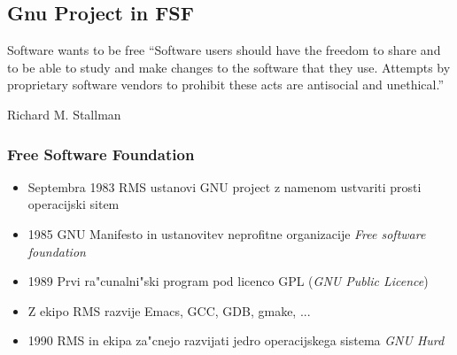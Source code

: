 \documentclass{beamer}
\begin{document}
\subsection{Gnu Project in FSF}
\begin{frame}
\begin{block}{Software wants to be free}
``Software users should have the freedom to share and to be able to study and make changes to the software that they use. Attempts by proprietary software vendors to prohibit these acts are antisocial and unethical.''

\hfill\tiny Richard M. Stallman
\end{block}
\end{frame}
\begin{frame}
\frametitle{Free Software Foundation}
\begin{itemize}
\item Septembra 1983 RMS ustanovi GNU project z namenom ustvariti prosti operacijski sitem
\item 1985 GNU Manifesto in ustanovitev neprofitne organizacije \textit{Free software foundation}
\item 1989 Prvi ra"cunalni"ski program pod licenco GPL (\textit{GNU Public Licence})
\item Z ekipo RMS razvije Emacs, GCC, GDB, gmake, ...
\item 1990 RMS in ekipa za"cnejo razvijati jedro operacijskega sistema \textit{GNU Hurd}
\end{itemize}
\end{frame}
\end{document}

